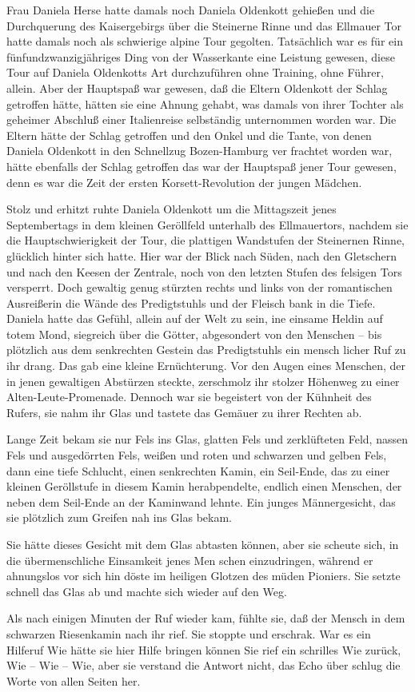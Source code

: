 Frau Daniela Herse hatte damals noch Daniela Oldenkott
gehießen und die Durchquerung des Kaisergebirgs über die
Steinerne Rinne und das Ellmauer Tor hatte damals noch
als schwierige alpine Tour gegolten. Tatsächlich war es für
ein fünfundzwanzigjähriges Ding von der Wasserkante eine
Leistung gewesen, diese Tour auf Daniela Oldenkotts Art
durchzuführen\dopp{} ohne Training, ohne Führer, allein. Aber der
Hauptspaß war gewesen, daß die Eltern Oldenkott der Schlag
getroffen hätte, hätten sie eine Ahnung gehabt, was damals
von ihrer Tochter als geheimer Abschluß einer Italienreise
selbständig unternommen worden war. Die Eltern hätte der
Schlag getroffen und den Onkel und die Tante, von denen
Daniela Oldenkott in den Schnellzug Bozen-Hamburg ver\-%
frachtet worden war, hätte ebenfalls der Schlag getroffen\dopp{}
das war der Hauptspaß jener Tour gewesen, denn es war die
Zeit der ersten Korsett-Revolution der jungen Mädchen.

Stolz und erhitzt ruhte Daniela Oldenkott um die Mittagszeit
jenes Septembertags in dem kleinen Geröllfeld unterhalb
des Ellmauertors, nachdem sie die Hauptschwierigkeit der
Tour, die plattigen Wandstufen der Steinernen Rinne,
glücklich hinter sich hatte. Hier war der Blick nach Süden,
nach den Gletschern und nach den Keesen der Zentrale,
noch von den letzten Stufen des felsigen Tors versperrt. Doch
gewaltig genug stürzten rechts und links von der romantischen
Ausreißerin die Wände des Predigtstuhls und der Fleisch\-%
bank in die Tiefe. Daniela hatte das Gefühl, allein auf der
Welt zu sein, ine einsame Heldin auf totem Mond, siegreich
über die Götter, abgesondert von den Menschen -- bis plötzlich
aus dem senkrechten Gestein das Predigtstuhls ein mensch\-%
licher Ruf zu ihr drang. Das gab eine kleine Ernüchterung.
Vor den Augen eines Menschen, der in jenen gewaltigen
Abstürzen steckte, zerschmolz ihr stolzer Höhenweg zu einer
Alten-Leute-Promenade. Dennoch war sie begeistert von der
Kühnheit des Rufers, sie nahm ihr Glas und tastete das
Gemäuer zu ihrer Rechten ab.

Lange Zeit bekam sie nur Fels ins Glas, glatten Fels und
zerklüfteten Feld, nassen Fels und ausgedörrten Fels, weißen
und roten und schwarzen und gelben Fels, dann eine tiefe
Schlucht, einen senkrechten Kamin, ein Seil-Ende, das zu
einer kleinen Geröllstufe in diesem Kamin herabpendelte,
endlich einen Menschen, der neben dem Seil-Ende an der
Kaminwand lehnte. Ein junges Männergesicht, das sie plötzlich
zum Greifen nah ins Glas bekam.

Sie hätte dieses Gesicht mit dem Glas abtasten können, aber
sie scheute sich, in die übermenschliche Einsamkeit jenes Men\-%
schen einzudringen, während er ahnungslos vor sich hin döste
im heiligen Glotzen des müden Pioniers. Sie setzte schnell das
Glas ab und machte sich wieder auf den Weg.

Als nach einigen Minuten der Ruf wieder kam, fühlte sie, daß
der Mensch in dem schwarzen Riesenkamin nach ihr rief. Sie
stoppte und erschrak. War es ein Hilferuf\frag{} Wie hätte sie hier
Hilfe bringen können\frag{} Sie rief ein schrilles Wie zurück, Wie --
Wie -- Wie, aber sie verstand die Antwort nicht, das Echo über\-%
schlug die Worte von allen Seiten her.
